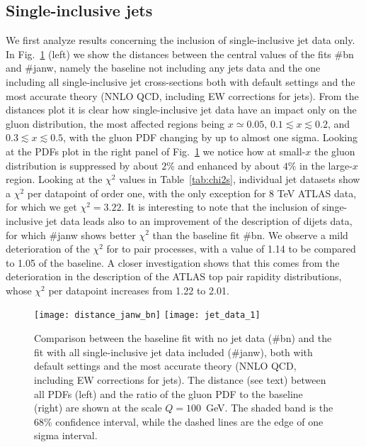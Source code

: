 \subsection{Single-inclusive jets}
\label{sec:single_jet}
We first analyze results concerning the inclusion of single-inclusive jet data only.
In Fig.~\ref{fig:jet_data_total} (left) we show the distances between the central values of the fits \#bn and \#janw, 
namely the baseline not including any jets data and the one including all single-inclusive jet cross-sections 
both with default settings and the most accurate theory (NNLO QCD, including EW
corrections for jets).
From the distances plot it is clear how single-inclusive jet data have an impact only on the gluon distribution,
the most affected regions being $x\simeq 0.05$, $0.1\lesssim x \lesssim 0.2$, and
$0.3\lesssim x\lesssim 0.5$, with the gluon PDF changing by up to almost one sigma. 
Looking at the PDFs plot in the right panel of Fig.~\ref{fig:jet_data_total} we notice how at small-$x$ 
the gluon distribution is suppressed by about $2\%$ and enhanced by about $4\%$ in the large-$x$ region.
%
Looking at the $\chi^2$ values in Table~\ref{tab:chi2s}, individual jet datasets show a $\chi^2$ per datapoint 
of order one, with the only exception for 8 TeV ATLAS data, for which we get $\chi^2 = 3.22$.
It is interesting to note that the inclusion of singe-inclusive jet data leads also to an improvement 
of the description of dijets data, for which \#janw shows better $\chi^2$ than the baseline fit \#bn.
%   
We observe a mild deterioration of the $\chi^2$ for to pair processes, with a value of 1.14 to be compared to
1.05 of the baseline. A closer investigation shows that this comes from the deterioration in the description 
of the ATLAS top pair rapidity distributions, whose $\chi^2$ per datapoint increases from 1.22 to 2.01.

\begin{figure}[!t]
    \centering
    \texttt{[image: distance\_janw\_bn]}
    \texttt{[image: jet\_data\_1]}\\
    \caption{ Comparison between the baseline fit with no jet data  (\#bn)
      and the fit with all single-inclusive jet data included (\#janw), both with
      default settings and the most accurate theory (NNLO QCD, including EW
      corrections for jets). The distance (see text) between all PDFs
      (left) and the ratio of the gluon PDF to the baseline (right) are shown at the scale
      $Q=100$~GeV. The shaded band is the 68\% confidence interval,
      while the dashed lines are the edge of one sigma interval.}
    \label{fig:jet_data_total}
\end{figure}

